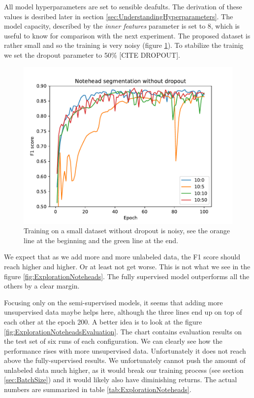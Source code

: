 All model hyperparameters are set to sensible deafults. The derivation of these values is desribed later in section \ref{sec:UnderstandingHyperparameters}. The model capacity, described by the \emph{inner features} parameter is set to 8, which is useful to know for comparison with the next experiment. The proposed dataset is rather small and so the training is very noisy (figure \ref{fig:ExplorationNoteheadsNoDropout}). To stabilize the trainig we set the dropout parameter to 50\% [CITE DROPOUT].

\begin{figure}[ht]
    \centering
    \includegraphics[width=140mm]{../../figures/01-exploration-noteheads/noteheads.pdf}
    \caption{Training on a small dataset without dropout is noisy, see the orange line at the beginning and the green line at the end.}
    \label{fig:ExplorationNoteheadsNoDropout}
\end{figure}

We expect that as we add more and more unlabeled data, the F1 score should reach higher and higher. Or at least not get worse. This is not what we see in the figure \ref{fig:ExplorationNoteheads}. The fully supervised model outperforms all the others by a clear margin.

Focusing only on the semi-supervised models, it seems that adding more unsupervised data maybe helps here, although the three lines end up on top of each other at the epoch 200. A better idea is to look at the figure \ref{fig:ExplorationNoteheadsEvaluation}. The chart contains evaluation results on the test set of six runs of each configuration. We can clearly see how the performance rises with more unsupervised data. Unfortunately it does not reach above the fully-supervised results. We unfortunately cannot push the amount of unlabeled data much higher, as it would break our training process (see section \ref{sec:BatchSize}) and it would likely also have diminishing returns. The actual numbers are summarized in table \ref{tab:ExplorationNoteheads}.


